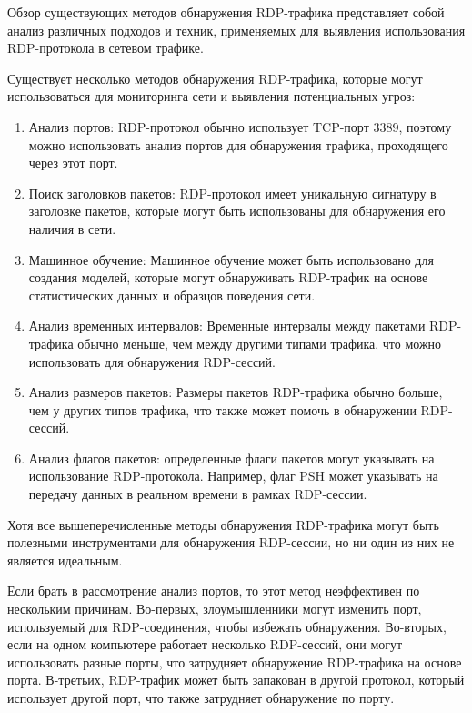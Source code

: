 \documentclass[bachelor, och, coursework]{SCWorks}
\begin{document}

Обзор существующих методов обнаружения RDP-трафика представляет собой анализ различных подходов и техник, применяемых для выявления 
использования RDP-протокола в сетевом трафике.

Существует несколько методов обнаружения RDP-трафика, которые могут использоваться для мониторинга сети и выявления потенциальных угроз:

\begin{enumerate}
  \item Анализ портов: RDP-протокол обычно использует TCP-порт 3389, поэтому можно использовать анализ портов для обнаружения трафика, 
  проходящего через этот порт.
  \item Поиск заголовков пакетов: RDP-протокол имеет уникальную сигнатуру в заголовке пакетов, которые могут быть использованы для 
  обнаружения его наличия в сети.
  \item Машинное обучение: Машинное обучение может быть использовано для создания моделей, которые могут обнаруживать RDP-трафик на 
  основе статистических данных и образцов поведения сети.
  \item Анализ временных интервалов: Временные интервалы между пакетами RDP-трафика обычно меньше, чем между другими типами трафика, 
  что можно использовать для обнаружения RDP-сессий.
  \item Анализ размеров пакетов: Размеры пакетов RDP-трафика обычно больше, чем у других типов трафика, что также может помочь в 
  обнаружении RDP-сессий.
  \item Анализ флагов пакетов: определенные флаги пакетов могут указывать на использование RDP-протокола. Например, флаг PSH может 
  указывать на передачу данных в реальном времени в рамках RDP-сессии.
\end{enumerate}

Хотя все вышеперечисленные методы обнаружения RDP-трафика могут быть полезными инструментами для обнаружения RDP-сессии, но ни один из них 
не является идеальным.

Если брать в рассмотрение анализ портов, то этот метод неэффективен по нескольким причинам. Во-первых, злоумышленники могут изменить порт, 
используемый для RDP-соединения, чтобы избежать обнаружения. Во-вторых, если на одном компьютере работает несколько RDP-сессий, они могут 
использовать разные порты, что затрудняет обнаружение RDP-трафика на основе порта. В-третьих, RDP-трафик может быть запакован в другой 
протокол, который использует другой порт, что также затрудняет обнаружение по порту.
\end{document}
